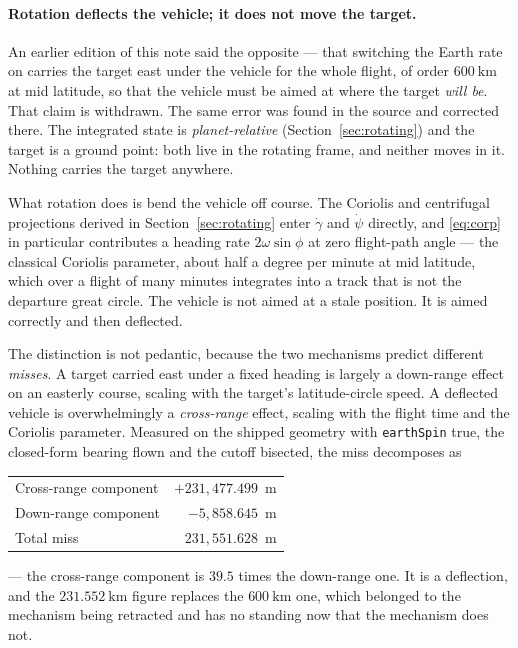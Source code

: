\documentclass[11pt]{article}
\newcommand{\code}[1]{\texttt{#1}}
\begin{document}
\paragraph{Rotation deflects the vehicle; it does not move the target.}
An earlier edition of this note said the opposite --- that switching the Earth
rate on carries the target east under the vehicle for the whole flight, of
order $600~\mathrm{km}$ at mid latitude, so that the vehicle must be aimed at
where the target \emph{will be}. That claim is withdrawn. The same error was
found in the source and corrected there. The integrated state is
\emph{planet-relative} (Section~\ref{sec:rotating}) and the target is a ground
point: both live in the rotating frame, and neither moves in it. Nothing
carries the target anywhere.

What rotation does is bend the vehicle off course. The Coriolis and
centrifugal projections derived in Section~\ref{sec:rotating} enter $\dot\gamma$
and $\dot\psi$ directly, and \eqref{eq:corp} in particular contributes a
heading rate $2\omega\sin\phi$ at zero flight-path angle --- the classical
Coriolis parameter, about half a degree per minute at mid latitude, which over
a flight of many minutes integrates into a track that is not the departure
great circle. The vehicle is not aimed at a stale position. It is aimed
correctly and then deflected.

The distinction is not pedantic, because the two mechanisms predict different
\emph{misses}. A target carried east under a fixed heading is largely a
down-range effect on an easterly course, scaling with the target's
latitude-circle speed. A deflected vehicle is overwhelmingly a
\emph{cross-range} effect, scaling with the flight time and the Coriolis
parameter. Measured on the shipped geometry with \code{earthSpin} true, the
closed-form bearing flown and the cutoff bisected, the miss decomposes as
\begin{center}
\begin{tabular}{lr}
\toprule
Cross-range component & $+231{,}477.499$~m \\
Down-range component  & $-5{,}858.645$~m \\
\midrule
Total miss            & $231{,}551.628$~m \\
\bottomrule
\end{tabular}
\end{center}
--- the cross-range component is $39.5$ times the down-range one. It is a
deflection, and the
$231.552~\mathrm{km}$ figure replaces the $600~\mathrm{km}$ one, which belonged
to the mechanism being retracted and has no standing now that the mechanism
does not.
\end{document}
